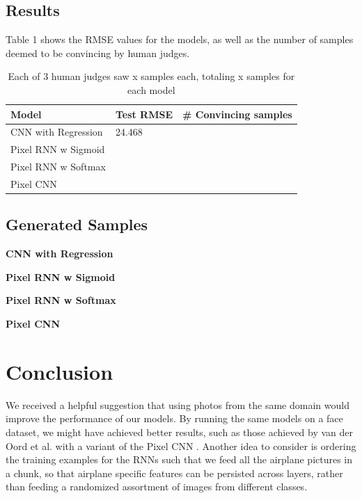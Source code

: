 \documentclass[10pt,twocolumn,letterpaper]{article}
\begin{document}
\subsection{Results}
Table 1 shows the RMSE values for the models, as well as the number of samples deemed to be convincing by human judges. 
\begin{table}[!ht]
\centering
\caption{Each of 3 human judges saw x samples each, totaling x samples for each model}
\begin{tabular}{lll}
\hline
Model               & Test RMSE & \# Convincing samples \\ \hline
CNN with Regression & 24.468    &                       \\
Pixel RNN w Sigmoid &           &                       \\
Pixel RNN w Softmax &           &                       \\
Pixel CNN           &           &                       \\ \hline
\end{tabular}
\end{table}

\subsection{Generated Samples}
\textbf{CNN with Regression}

\textbf{Pixel RNN w Sigmoid}

\textbf{Pixel RNN w Softmax}

\textbf{Pixel CNN}

\section{Conclusion}

We received a helpful suggestion that using photos from the same domain would improve the performance of our models. By running the same models on a face dataset, we might have achieved better results, such as those achieved by van der Oord et al. with a variant of the Pixel CNN \cite{pixelCNN}. Another idea to consider is ordering the training examples for the RNNs such that we feed all the airplane pictures in a chunk, so that airplane specific features can be persisted across layers, rather than feeding a randomized assortment of images from different classes.\\
\end{document}
